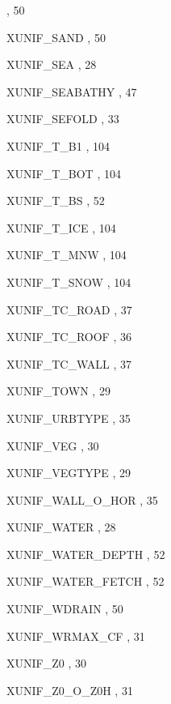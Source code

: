 \begin{theindex}
    \subitem {},  50
  \item XUNIF\_SAND
    \subitem {},  50
  \item XUNIF\_SEA
    \subitem {},  28
  \item XUNIF\_SEABATHY
    \subitem {},  47
  \item XUNIF\_SEFOLD
    \subitem {},  33
  \item XUNIF\_T\_B1
    \subitem {},  104
  \item XUNIF\_T\_BOT
    \subitem {},  104
  \item XUNIF\_T\_BS
    \subitem {},  52
  \item XUNIF\_T\_ICE
    \subitem {},  104
  \item XUNIF\_T\_MNW
    \subitem {},  104
  \item XUNIF\_T\_SNOW
    \subitem {},  104
  \item XUNIF\_TC\_ROAD
    \subitem {},  37
  \item XUNIF\_TC\_ROOF
    \subitem {},  36
  \item XUNIF\_TC\_WALL
    \subitem {},  37
  \item XUNIF\_TOWN
    \subitem {},  29
  \item XUNIF\_URBTYPE
    \subitem {},  35
  \item XUNIF\_VEG
    \subitem {},  30
  \item XUNIF\_VEGTYPE
    \subitem {},  29
  \item XUNIF\_WALL\_O\_HOR
    \subitem {},  35
  \item XUNIF\_WATER
    \subitem {},  28
  \item XUNIF\_WATER\_DEPTH
    \subitem {},  52
  \item XUNIF\_WATER\_FETCH
    \subitem {},  52
  \item XUNIF\_WDRAIN
    \subitem {},  50
  \item XUNIF\_WRMAX\_CF
    \subitem {},  31
  \item XUNIF\_Z0
    \subitem {},  30
  \item XUNIF\_Z0\_O\_Z0H
    \subitem {},  31

\end{theindex}
